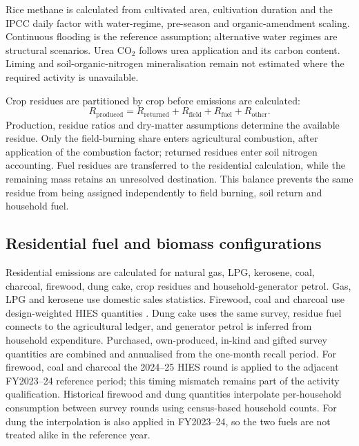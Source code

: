 \documentclass[essd]{copernicus}
\begin{document}
Rice methane is calculated from cultivated area, cultivation duration and the IPCC daily factor with water-regime, pre-season and organic-amendment scaling. Continuous flooding is the reference assumption; alternative water regimes are structural scenarios. Urea CO$_2$ follows urea application and its carbon content. Liming and soil-organic-nitrogen mineralisation remain not estimated where the required activity is unavailable.

Crop residues are partitioned by crop before emissions are calculated:
\begin{equation}
 R_{\mathrm{produced}}=R_{\mathrm{returned}}+R_{\mathrm{field}}
 +R_{\mathrm{fuel}}+R_{\mathrm{other}}.
 \label{eq:residue_balance}
\end{equation}
Production, residue ratios and dry-matter assumptions determine the available residue. Only the field-burning share enters agricultural combustion, after application of the combustion factor; returned residues enter soil nitrogen accounting. Fuel residues are transferred to the residential calculation, while the remaining mass retains an unresolved destination. This balance prevents the same residue from being assigned independently to field burning, soil return and household fuel.

\subsection{Residential fuel and biomass configurations}
\label{sec:residential_methods}

Residential emissions are calculated for natural gas, LPG, kerosene, coal, charcoal, firewood, dung cake, crop residues and household-generator petrol. Gas, LPG and kerosene use domestic sales statistics. Firewood, coal and charcoal use design-weighted HIES quantities \citep{HIES2019,PBSHIES2026}. Dung cake uses the same survey, residue fuel connects to the agricultural ledger, and generator petrol is inferred from household expenditure. Purchased, own-produced, in-kind and gifted survey quantities are combined and annualised from the one-month recall period. For firewood, coal and charcoal the 2024--25 HIES round is applied to the adjacent FY2023--24 reference period; this timing mismatch remains part of the activity qualification. Historical firewood and dung quantities interpolate per-household consumption between survey rounds using census-based household counts. For dung the interpolation is also applied in FY2023--24, so the two fuels are not treated alike in the reference year.
\end{document}
